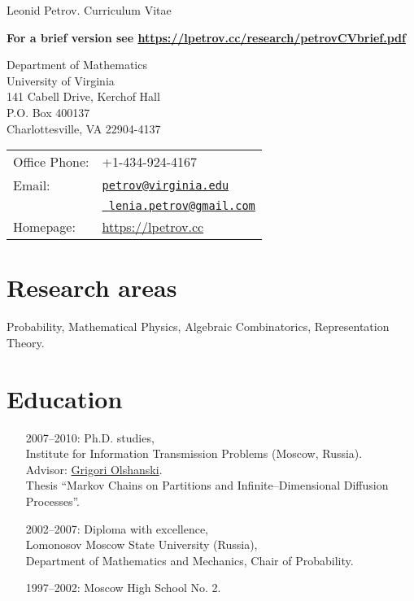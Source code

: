 \documentclass[letterpaper,11pt]{article}
\def\name{Leonid Petrov}
\begin{document}
{\huge \name{}. Curriculum Vitae}
\medskip

\textbf{For a brief version see \url{https://lpetrov.cc/research/petrovCVbrief.pdf}}

\noindent\hrulefill


\vspace{0.25in}


\begin{minipage}{0.45\linewidth}
	Department of Mathematics\\ University of Virginia\\ 141 Cabell Drive,
	Kerchof Hall\\ P.O. Box 400137\\ Charlottesville, VA 22904-4137
\end{minipage}
\begin{minipage}{0.45\linewidth}
	\begin{tabular}{ll}
		Office Phone: & +1-434-924-4167                           \\
		Email:        &
		\href{mailto:petrov@virginia.edu}{\tt petrov@virginia.edu}\\&
		\href{mailto:lenia.petrov@gmail.com}{\tt
			lenia.petrov@gmail.com}
		\\
		Homepage:     & \url{https://lpetrov.cc} \\
	\end{tabular}
\end{minipage}

\section*{Research areas}

Probability, Mathematical Physics, Algebraic Combinatorics, Representation
Theory.

\section*{Education}

\begin{itemize}
	\item
	      [2007--2010:]
	      Ph.D. studies,\\Institute for Information Transmission Problems
	      (Moscow, Russia). \\ Advisor:
	      \href{http://www.iitp.ru/en/userpages/88/}{Grigori Olshanski}.\\ Thesis
	      ``Markov Chains on Partitions and Infinite--Dimensional Diffusion Processes''.

	\item
	      [2002--2007:]
	      Diploma with excellence,\\ Lomonosov Moscow State University
	      (Russia),\\ Department of Mathematics and Mechanics, Chair of Probability.

	\item
	      [1997--2002:] Moscow High School No. 2.

\end{itemize}
\end{document}
